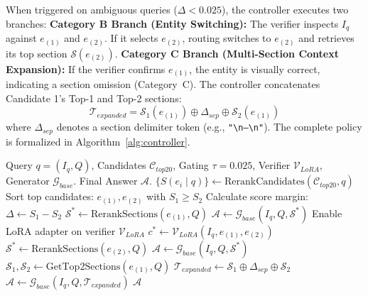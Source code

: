 \documentclass[conference]{IEEEtran}
\begin{document}
When triggered on ambiguous queries ($\Delta < 0.025$), the controller executes two branches:
\textbf{Category B Branch (Entity Switching):} The verifier inspects $I_q$ against $e_{(1)}$ and $e_{(2)}$. If it selects $e_{(2)}$, routing switches to $e_{(2)}$ and retrieves its top section $\mathcal{S}(e_{(2)})$.
\textbf{Category C Branch (Multi-Section Context Expansion):} If the verifier confirms $e_{(1)}$, the entity is visually correct, indicating a section omission (Category~C). The controller concatenates Candidate 1's Top-1 and Top-2 sections:
\begin{equation}
\mathcal{T}_{expanded} = \mathcal{S}_1(e_{(1)}) \oplus \Delta_{sep} \oplus \mathcal{S}_2(e_{(1)})
\label{eq:context_expansion}
\end{equation}
where $\Delta_{sep}$ denotes a section delimiter token (e.g., \texttt{"\textbackslash n---\textbackslash n"}). The complete policy is formalized in Algorithm~\ref{alg:controller}.

\begin{algorithm}[!htbp]
\caption{Adaptive Agentic Retrieval Decision Policy}
\label{alg:controller}
\begin{algorithmic}[1]
\footnotesize
\REQUIRE Query $q = (I_q, Q)$, Candidates $\mathcal{C}_{top20}$, Gating $\tau = 0.025$, Verifier $\mathcal{V}_{LoRA}$, Generator $\mathcal{G}_{base}$.
\ENSURE Final Answer $\mathcal{A}$.
\STATE $\{S(e_i \mid q)\} \leftarrow \text{RerankCandidates}(\mathcal{C}_{top20}, q)$
\STATE Sort top candidates: $e_{(1)}, e_{(2)}$ with $S_1 \ge S_2$
\STATE Calculate score margin: $\Delta \leftarrow S_1 - S_2$
\IF{$\Delta \ge \tau$}
    \STATE {}
    \STATE $\mathcal{S}^* \leftarrow \text{RerankSections}(e_{(1)}, Q)$
    \STATE $\mathcal{A} \leftarrow \mathcal{G}_{base}(I_q, Q, \mathcal{S}^*)$
\ELSE
    \STATE {}
    \STATE Enable LoRA adapter on verifier $\mathcal{V}_{LoRA}$
    \STATE $c^* \leftarrow \mathcal{V}_{LoRA}(I_q, e_{(1)}, e_{(2)})$
        \STATE {}
        \STATE $\mathcal{S}^* \leftarrow \text{RerankSections}(e_{(2)}, Q)$
        \STATE $\mathcal{A} \leftarrow \mathcal{G}_{base}(I_q, Q, \mathcal{S}^*)$ 
    \ELSE
        \STATE {}
        \STATE $\mathcal{S}_1, \mathcal{S}_2 \leftarrow \text{GetTop2Sections}(e_{(1)}, Q)$
        \STATE $\mathcal{T}_{expanded} \leftarrow \mathcal{S}_1 \oplus \Delta_{sep} \oplus \mathcal{S}_2$
        \STATE $\mathcal{A} \leftarrow \mathcal{G}_{base}(I_q, Q, \mathcal{T}_{expanded})$ 
    \ENDIF
\ENDIF
\RETURN $\mathcal{A}$
\end{algorithmic}
\end{algorithm}
\end{document}
